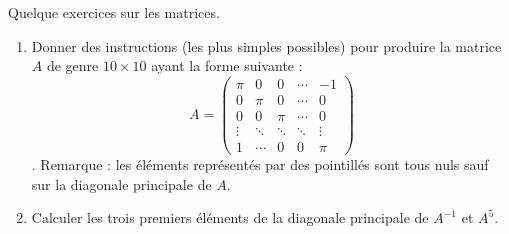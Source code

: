 \begin{exercice}\label{exoSC_serie1-0004}

	Quelque exercices sur les matrices.
	\begin{enumerate}

		\item
			Donner des instructions (les plus simples possibles) pour produire la matrice $A$ de genre $10\times 10$ ayant la forme suivante :
			\begin{equation}
				A=\begin{pmatrix}
					\pi	&	0	&	0	&	\cdots	&	-1\\	
					0	&	\pi	&	0	&	\cdots	&	0\\	
					0	&	0	&	\pi	&	\cdots	&	0\\	
					\vdots	&	\ddots	&	\ddots	&	\ddots	&	\vdots\\	
					1	&	\cdots	&	0	&	0	&	\pi
				\end{pmatrix}
			\end{equation}.
			Remarque : les éléments représentés par des pointillés sont tous nuls sauf sur la diagonale principale de $A$.
		\item
			Calculer les trois premiers éléments de la diagonale principale de $A^{-1}$ et $A^5$.
	\end{enumerate}

\end{exercice}
